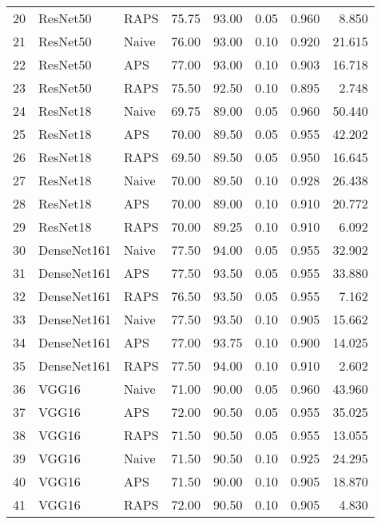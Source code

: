 \begin{tabular}{lllrrrrr}
20 &     ResNet50 &      RAPS &  75.75 &  93.00 &   0.05 &     0.960 &    8.850 \\
21 &     ResNet50 &     Naive &  76.00 &  93.00 &   0.10 &     0.920 &   21.615 \\
22 &     ResNet50 &       APS &  77.00 &  93.00 &   0.10 &     0.903 &   16.718 \\
23 &     ResNet50 &      RAPS &  75.50 &  92.50 &   0.10 &     0.895 &    2.748 \\
24 &     ResNet18 &     Naive &  69.75 &  89.00 &   0.05 &     0.960 &   50.440 \\
25 &     ResNet18 &       APS &  70.00 &  89.50 &   0.05 &     0.955 &   42.202 \\
26 &     ResNet18 &      RAPS &  69.50 &  89.50 &   0.05 &     0.950 &   16.645 \\
27 &     ResNet18 &     Naive &  70.00 &  89.50 &   0.10 &     0.928 &   26.438 \\
28 &     ResNet18 &       APS &  70.00 &  89.00 &   0.10 &     0.910 &   20.772 \\
29 &     ResNet18 &      RAPS &  70.00 &  89.25 &   0.10 &     0.910 &    6.092 \\
30 &  DenseNet161 &     Naive &  77.50 &  94.00 &   0.05 &     0.955 &   32.902 \\
31 &  DenseNet161 &       APS &  77.50 &  93.50 &   0.05 &     0.955 &   33.880 \\
32 &  DenseNet161 &      RAPS &  76.50 &  93.50 &   0.05 &     0.955 &    7.162 \\
33 &  DenseNet161 &     Naive &  77.50 &  93.50 &   0.10 &     0.905 &   15.662 \\
34 &  DenseNet161 &       APS &  77.00 &  93.75 &   0.10 &     0.900 &   14.025 \\
35 &  DenseNet161 &      RAPS &  77.50 &  94.00 &   0.10 &     0.910 &    2.602 \\
36 &        VGG16 &     Naive &  71.00 &  90.00 &   0.05 &     0.960 &   43.960 \\
37 &        VGG16 &       APS &  72.00 &  90.50 &   0.05 &     0.955 &   35.025 \\
38 &        VGG16 &      RAPS &  71.50 &  90.50 &   0.05 &     0.955 &   13.055 \\
39 &        VGG16 &     Naive &  71.50 &  90.50 &   0.10 &     0.925 &   24.295 \\
40 &        VGG16 &       APS &  71.50 &  90.00 &   0.10 &     0.905 &   18.870 \\
41 &        VGG16 &      RAPS &  72.00 &  90.50 &   0.10 &     0.905 &    4.830 \\

\end{tabular}
